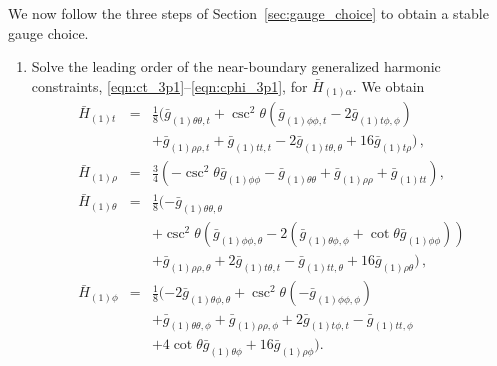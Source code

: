 \documentclass[aps,letterpaper,twocolumn,nofootinbib]{revtex4}
\numberwithin{equation}{section}
\begin{document}
We now follow the three steps of Section~\ref{sec:gauge_choice} to obtain a stable gauge choice.
\begin{enumerate}
\item Solve the leading order of the near-boundary generalized harmonic constraints, \eqref{eqn:ct_3p1}--\eqref{eqn:cphi_3p1}, for $\bar{H}_{(1)\alpha}$. We obtain
\begin{eqnarray}\label{eqn:target_gauge_trhothetaphi_step1}
\bar{H}_{(1)t}&=&\frac{1}{8} (\bar{g}_{(1)\theta \theta,t} +\csc ^2\theta \left(\bar{g}_{(1) \phi \phi ,t}-2 \bar{g}_{(1) \text{$t$$\phi$},\phi }\right)\nonumber \\
   &&+\bar{g}_{(1) \rho \rho ,t}+\bar{g}_{(1) \text{$tt$},t}-2 \bar{g}_{(1) \text{$t$$\theta $},\theta }+16 \bar{g}_{(1) \text{$t$$\rho
   $}})\,,\nonumber \\
\bar{H}_{(1)\rho}&=&\frac{3}{4} \left(-\csc ^2\theta \bar{g}_{(1) \phi \phi }-\bar{g}_{(1)\theta \theta}+\bar{g}_{(1) \rho \rho }+\bar{g}_{(1) \text{$tt$}}\right),\nonumber\\
\bar{H}_{(1)\theta}&=&\frac{1}{8} (-\bar{g}_{(1)\theta \theta,\theta } \nonumber \\
    &&+\csc ^2\theta \left(\bar{g}_{(1)
   \phi \phi ,\theta }-2 \left(\bar{g}_{(1)\theta \phi,\phi }+\cot \theta  \bar{g}_{(1)
   \phi \phi }\right)\right)\nonumber\\
   &&+\bar{g}_{(1) \rho \rho ,\theta }+2 \bar{g}_{(1) \text{$t$$\theta
   $},t}-\bar{g}_{(1) \text{$tt$},\theta }+16 \bar{g}_{(1) \rho \theta })\,,\nonumber\\
\bar{H}_{(1)\phi}&=&\frac{1}{8} (-2 \bar{g}_{(1)\theta \phi,\theta } +\csc ^2\theta \left(-\bar{g}_{(1)
   \phi \phi ,\phi }\right)\nonumber \\
   &&+\bar{g}_{(1)\theta \theta,\phi }+\bar{g}_{(1) \rho \rho ,\phi
   }+2 \bar{g}_{(1) \text{$t$$\phi $},t}-\bar{g}_{(1) \text{$tt$},\phi }\nonumber\\
   &&+4 \cot \theta 
   \bar{g}_{(1)\theta \phi}+16 \bar{g}_{(1) \rho \phi }).
\end{eqnarray}


\end{enumerate}
\end{document}

